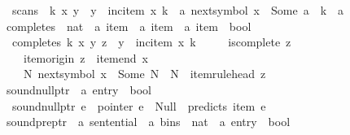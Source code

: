\begin{isabellebody}
\ \ {\isachardoublequoteopen}scans\ {\isasymomega}\ k\ x\ y\ {\isasymequiv}\ y\ {\isacharequal}{\kern0pt}\ inc{\isacharunderscore}{\kern0pt}item\ x\ k\ {\isasymand}\ {\isacharparenleft}{\kern0pt}{\isasymexists}a{\isachardot}{\kern0pt}\ next{\isacharunderscore}{\kern0pt}symbol\ x\ {\isacharequal}{\kern0pt}\ Some\ a\ {\isasymand}\ {\isasymomega}{\isacharbang}{\kern0pt}{\isacharparenleft}{\kern0pt}k{\isacharminus}{\kern0pt}{}{\isacharparenright}{\kern0pt}\ {\isacharequal}{\kern0pt}\ a{\isacharparenright}{\kern0pt}{\isachardoublequoteclose}\isanewline
\isanewline
{}\isamarkupfalse%
\ completes\ {\isacharcolon}{\kern0pt}{\isacharcolon}{\kern0pt}\ {\isachardoublequoteopen}nat\ {\isasymRightarrow}\ {\isacharprime}{\kern0pt}a\ item\ {\isasymRightarrow}\ {\isacharprime}{\kern0pt}a\ item\ {\isasymRightarrow}\ {\isacharprime}{\kern0pt}a\ item\ {\isasymRightarrow}\ bool{\isachardoublequoteclose}\ \isanewline
\ \ {\isachardoublequoteopen}completes\ k\ x\ y\ z\ {\isasymequiv}\ y\ {\isacharequal}{\kern0pt}\ inc{\isacharunderscore}{\kern0pt}item\ x\ k\ {\isasymand}\isanewline
\ \ \ \ is{\isacharunderscore}{\kern0pt}complete\ z\ {\isasymand}\isanewline
\ \ \ \ item{\isacharunderscore}{\kern0pt}origin\ z\ {\isacharequal}{\kern0pt}\ item{\isacharunderscore}{\kern0pt}end\ x\ {\isasymand}\isanewline
\ \ \ \ {\isacharparenleft}{\kern0pt}{\isasymexists}N{\isachardot}{\kern0pt}\ next{\isacharunderscore}{\kern0pt}symbol\ x\ {\isacharequal}{\kern0pt}\ Some\ N\ {\isasymand}\ N\ {\isacharequal}{\kern0pt}\ item{\isacharunderscore}{\kern0pt}rule{\isacharunderscore}{\kern0pt}head\ z{\isacharparenright}{\kern0pt}{\isachardoublequoteclose}\isanewline
\isanewline
{}\isamarkupfalse%
\ sound{\isacharunderscore}{\kern0pt}null{\isacharunderscore}{\kern0pt}ptr\ {\isacharcolon}{\kern0pt}{\isacharcolon}{\kern0pt}\ {\isachardoublequoteopen}{\isacharprime}{\kern0pt}a\ entry\ {\isasymRightarrow}\ bool{\isachardoublequoteclose}\ \isanewline
\ \ {\isachardoublequoteopen}sound{\isacharunderscore}{\kern0pt}null{\isacharunderscore}{\kern0pt}ptr\ e\ {\isasymequiv}\ pointer\ e\ {\isacharequal}{\kern0pt}\ Null\ {\isasymlongrightarrow}\ predicts\ {\isacharparenleft}{\kern0pt}item\ e{\isacharparenright}{\kern0pt}{\isachardoublequoteclose}\isanewline
\isanewline
{}\isamarkupfalse%
\ sound{\isacharunderscore}{\kern0pt}pre{\isacharunderscore}{\kern0pt}ptr\ {\isacharcolon}{\kern0pt}{\isacharcolon}{\kern0pt}\ {\isachardoublequoteopen}{\isacharprime}{\kern0pt}a\ sentential\ {\isasymRightarrow}\ {\isacharprime}{\kern0pt}a\ bins\ {\isasymRightarrow}\ nat\ {\isasymRightarrow}\ {\isacharprime}{\kern0pt}a\ entry\ {\isasymRightarrow}\ bool{\isachardoublequoteclose}\ \isanewline

\end{isabellebody}
